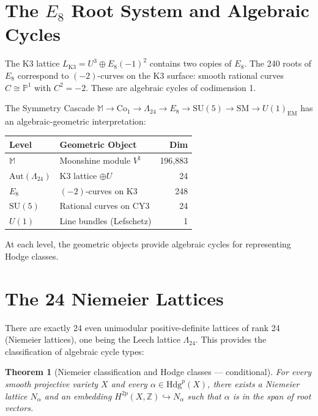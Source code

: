 \documentclass[12pt,a4paper]{article}
\newtheorem{theorem}{Theorem}[section]
\begin{document}
\section{The $E_8$ Root System and Algebraic Cycles}

The K3 lattice $L_{\text{K3}} = U^3 \oplus E_8(-1)^2$ contains two copies of $E_8$. The 240 roots of $E_8$ correspond to $(-2)$-curves on the K3 surface: smooth rational curves $C \cong \mathbb{P}^1$ with $C^2 = -2$. These are algebraic cycles of codimension 1.

The Symmetry Cascade $\mathbb{M} \to \text{Co}_1 \to \Lambda_{24} \to E_8 \to \text{SU}(5) \to \text{SM} \to U(1)_{\text{EM}}$ has an algebraic-geometric interpretation:

\begin{center}\small
\begin{tabular}{llr}
\toprule
Level & Geometric Object & Dim \\
\midrule
$\mathbb{M}$ & Moonshine module $V^\natural$ & 196{,}883 \\
$\text{Aut}(\Lambda_{24})$ & K3 lattice $\oplus U$ & 24 \\
$E_8$ & $(-2)$-curves on K3 & 248 \\
$\text{SU}(5)$ & Rational curves on CY3 & 24 \\
$U(1)$ & Line bundles (Lefschetz) & 1 \\
\bottomrule
\end{tabular}
\end{center}

At each level, the geometric objects provide algebraic cycles for representing Hodge classes.

\section{The 24 Niemeier Lattices}

There are exactly 24 even unimodular positive-definite lattices of rank 24 (Niemeier lattices), one being the Leech lattice $\Lambda_{24}$. This provides the classification of algebraic cycle types:

\begin{theorem}[Niemeier classification and Hodge classes --- conditional]
For every smooth projective variety $X$ and every $\alpha \in \text{Hdg}^p(X)$, there exists a Niemeier lattice $N_\alpha$ and an embedding $H^{2p}(X,\mathbb{Z}) \hookrightarrow N_\alpha$ such that $\alpha$ is in the span of root vectors.
\end{theorem}
\end{document}
